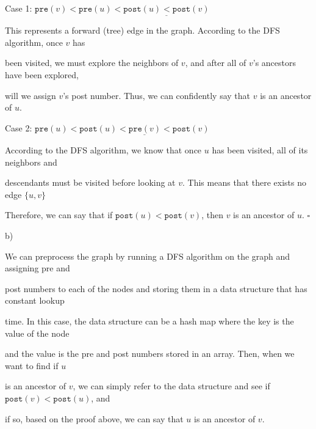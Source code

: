 \documentclass{article} %
\begin{document}
    Case 1: $\texttt{pre}(v)<\texttt{pre}(u)<\underline{\texttt{post}(u)<\texttt{post}(v)}$

    \vspace{2pt}

    This represents a forward (tree) edge in the graph. According to the DFS algorithm, once $v$ has
    
    been visited, we must explore the neighbors of $v$, and after all of $v$'s ancestors have been explored, 
    
    will we assign $v$'s post number. Thus, we can confidently say that $v$ is an ancestor of $u$. 

    \vspace{7pt}

    Case 2: $\texttt{pre}(u)<\underline{\texttt{post}(u)<\texttt{pre}(v)<\texttt{post}(v)}$
    
    \vspace{2pt}

    According to the DFS algorithm, we know that once $u$ has been visited, all of its neighbors and
    
    descendants must be visited before looking at $v$. This means that there exists no edge $\{u, v\}$ \faBolt

    \vspace{2pt}

    Therefore, we can say that if $\texttt{post}(u)<\texttt{post}(v)$, then $v$ is an ancestor of $u$. $\square$

    \vspace{10pt}

    b)

    We can preprocess the graph by running a DFS algorithm on the graph and assigning pre and 
    
    post numbers to each of the nodes and storing them in a data structure that has constant lookup
    
    time. In this case, the data structure can be a hash map where the key is the value of the node
    
    and the value is the pre and post numbers stored in an array. Then, when we want to find if $u$

    is an ancestor of $v$, we can simply refer to the data structure and see if $\texttt{post}(v) < \texttt{post}(u)$, and 
    
    if so, based on the proof above, we can say that $u$ is an ancestor of $v$.

    
\end{document}
